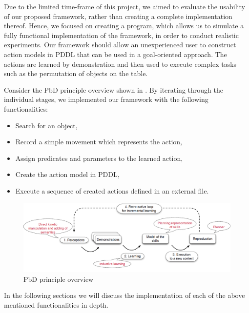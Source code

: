 Due to the limited time-frame of this project, we aimed to evaluate the usability of our proposed framework, rather than creating a complete implementation thereof.
Hence, we focused on creating a program, which allows us to simulate a fully functional implementation of the framework, in order to conduct realistic experiments.
Our framework should allow an unexperienced user to construct action models in PDDL that can be used in a goal-oriented approach.
The actions are learned by demonstration and then used to execute complex tasks such as the permutation of objects on the table.

Consider the PbD principle overview shown in .
By iterating through the individual stages, we implemented our framework with the following functionalities:
\begin{itemize}
\item Search for an object,
\item Record a simple movement which represents the action,
\item Assign predicates and parameters to the learned action,
\item Create the action model in PDDL,
\item Execute a sequence of created actions defined in an external file.
\end{itemize}

  \begin{figure}[ht]
    \centering
    \includegraphics[scale=0.45]{figures/Baxter-Case-Study}
    \caption{PbD principle overview}
    \label{fig:Baxter-Case-Study}
  \end{figure}

In the following sections we will discuss the implementation of each of the above mentioned functionalities in depth.

